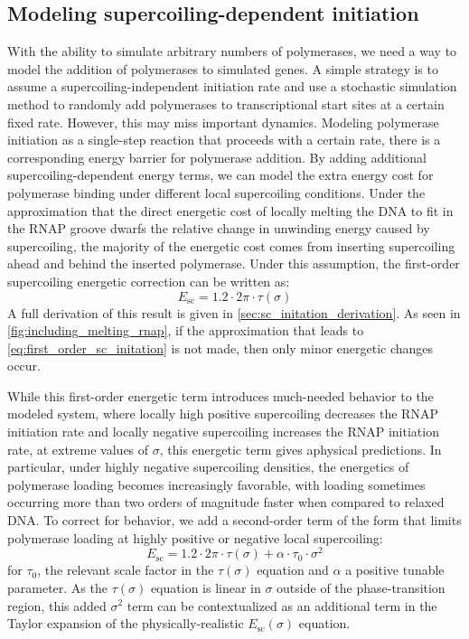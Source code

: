 \documentclass[11pt]{article}
\begin{document}
\subsection{Modeling supercoiling-dependent initiation}
With the ability to simulate arbitrary numbers of polymerases, we need a way to model the addition of polymerases to simulated genes. A simple strategy is to assume a supercoiling-independent initiation rate and use a stochastic simulation method to randomly add polymerases to transcriptional start sites at a certain fixed rate. However, this may miss important dynamics. Modeling polymerase initiation as a single-step reaction that proceeds with a certain rate, there is a corresponding energy barrier for polymerase addition. By adding additional supercoiling-dependent energy terms, we can model the extra energy cost for polymerase binding under different local supercoiling conditions. Under the approximation that the direct energetic cost of locally melting the DNA to fit in the RNAP groove dwarfs the relative change in unwinding energy caused by supercoiling, the majority of the energetic cost comes from inserting supercoiling ahead and behind the inserted polymerase. Under this assumption, the first-order supercoiling energetic correction can be written as:
\begin{equation}
    E_\text{sc} = 1.2  \cdot 2\pi \cdot \tau(\sigma)
\label{eq:first_order_sc_initation}
\end{equation}
A full derivation of this result is given in \cref{sec:sc_initation_derivation}. As seen in \cref{fig:including_melting_rnap}, if the approximation that leads to \cref{eq:first_order_sc_initation} is not made, then only minor energetic changes occur.

While this first-order energetic term introduces much-needed behavior to the modeled system, where locally high positive supercoiling decreases the RNAP initiation rate and locally negative supercoiling increases the RNAP initiation rate, at extreme values of \(\sigma\), this energetic term gives aphysical predictions. In particular, under highly negative supercoiling densities, the energetics of polymerase loading becomes increasingly favorable, with loading sometimes occurring more than two orders of magnitude faster when compared to relaxed DNA. To correct for behavior, we add a second-order term of the form that limits polymerase loading at highly positive or negative local supercoiling:
\begin{equation}
    E_\text{sc} = 1.2  \cdot 2\pi \cdot \tau(\sigma) + \alpha \cdot \tau_0 \cdot \sigma^2
\label{eq:second_order_sc_initation}
\end{equation}
for \(\tau_0\), the relevant scale factor in the \(\tau(\sigma)\) equation \parencite{markoTorqueDynamicsLinking2007} and \(\alpha\) a positive tunable parameter. As the \(\tau(\sigma)\) equation is linear in \(\sigma\) outside of the phase-transition region, this added \(\sigma^2\) term can be contextualized as an additional term in the Taylor expansion of the physically-realistic \(E_\text{sc}(\sigma)\) equation.
\end{document}
